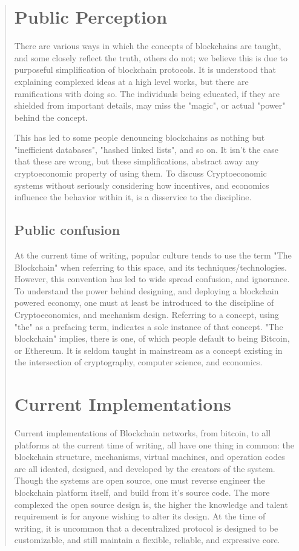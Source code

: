 \documentclass[12pt, titlepage, twocolumn]{report}
\begin{document}
\begin{quotation}
\section{Public Perception}
There are various ways in which the concepts of blockchains are taught, and some closely reflect the truth, others do not; we believe this is due to purposeful simplification of blockchain protocols. It is understood that explaining complexed ideas at a high level works, but there are ramifications with doing so. The individuals being educated, if they are shielded from important details, may miss the "magic", or actual "power" behind the concept.  

This has led to some people denouncing blockchains as nothing but "inefficient databases", "hashed linked lists", and so on. It isn't the case that these are wrong, but these simplifications, abstract away any cryptoeconomic property of using them. To discuss Cryptoeconomic systems without seriously considering how incentives, and economics influence the behavior within it, is a disservice to the discipline.




\subsection{Public confusion}
At the current time of writing, popular culture tends to use the term "The Blockchain" when referring to this space, and its techniques/technologies. However, this convention has led to wide spread confusion, and ignorance. To understand the power behind designing, and deploying a blockchain powered economy, one must at least be introduced to the discipline of Cryptoeconomics, and mechanism design. Referring to a concept, using "the" as a prefacing term, indicates a sole instance of that concept. "The blockchain" implies, there is one, of which people default to being Bitcoin, or Ethereum. It is seldom taught in mainstream as a concept existing in the intersection of cryptography, computer science, and economics. 




\section{Current Implementations}
Current implementations of Blockchain networks, from bitcoin, to all platforms at the current time of writing, all have one thing in common: the blockchain structure, mechanisms, virtual machines, and operation codes are all ideated, designed, and developed by the creators of the system. Though the systems are open source, one must reverse engineer the blockchain platform itself, and build from it's source code. The more complexed the open source design is, the higher the knowledge and talent requirement is for anyone wishing to alter its design. At the time of writing, it is uncommon that a decentralized protocol is designed to be customizable, and still maintain a flexible, reliable, and expressive core.


\end{quotation}
\end{document}
